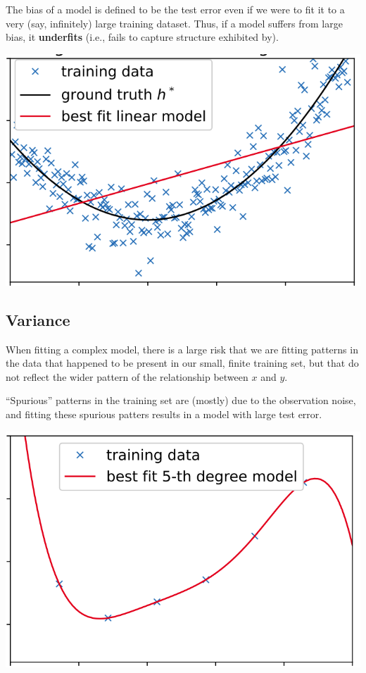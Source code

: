 \documentclass[8pt, a4paper, landscape, includeheadfoot]{extarticle}
\begin{document}
\begin{multicols*}{4}
	The bias of a model is defined to be the test error even
	if we were to fit it to a very (say, infinitely) large training dataset. Thus, if a model suffers from large bias, it \textbf{underfits} (i.e., fails to
	capture structure exhibited by).
	\begin{center}
		\includegraphics[width = 0.8\linewidth]{0_images/high_bias.png}
	\end{center}

	\subsection{Variance}
	When fitting a complex model, there is a large risk that we are fitting patterns in the data that happened to be present in our small, finite training set, but that do not reflect the wider pattern of the relationship between $x$ and $y$.

	“Spurious” patterns in the training
	set are (mostly) due to the observation noise, and fitting these spurious patters results in a model with large test error.

	\begin{center}
		\includegraphics[width = 0.8\linewidth]{0_images/high_variance.png}
	\end{center}


\end{multicols*}
\end{document}
